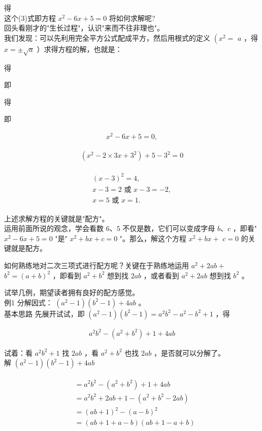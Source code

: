 \documentclass[10pt]{article}
\begin{document}
得\\
这个(3)式即方程 $x^{2}-6 x+5=0$ 将如何求解呢?\\
回头看刚才的"生长过程"，认识"来而不往非理也"。\\
我们发现：可以先利用完全平方公式配成平方，然后用根式的定义 $\left(x^{2}=\right.$ $a$ ，得 $x= \pm \sqrt{a}$ ）求得方程的解，也就是：

得

即

得

即

\begin{align*}
x^{2}-6 x+5=0,
\end{align*}

\begin{align*}
\left(x^{2}-2 \times 3 x+3^{2}\right)+5-3^{2}=0
\end{align*}

\begin{align*}
\begin{gathered}
(x-3)^{2}=4, \\
x-3=2 \text { 或 } x-3=-2, \\
x=5 \text { 或 } x=1 .
\end{gathered}
\end{align*}

上述求解方程的关键就是"配方"。\\
运用前面所说的观念，学会看数 $6 、 5$ 不仅是数，它们可以变成字母 $b 、 c$ ，即看" $x^{2}-6 x+5=0$ "是" $x^{2}+b x+c=0$ "。那么，解这个方程 $x^{2}+b x+$ $c=0$ 的关键就是配方。

如何熟练地对二次三项式进行配方呢？关键在于熟练地运用 $a^{2}+2 a b+$ $b^{2}=(a+b)^{2}$ ，即看到 $a^{2}+b^{2}$ 想到找 $2 a b$ ，或者看到 $a^{2}+2 a b$ 想到找 $b^{2}$ 。

试举几例，期望读者拥有良好的配方感觉。\\
例1 分解因式： $\left(a^{2}-1\right)\left(b^{2}-1\right)+4 a b$ 。\\
基本思路 先展开试试，即 $\left(a^{2}-1\right)\left(b^{2}-1\right)=a^{2} b^{2}-a^{2}-b^{2}+1$ ，得

\begin{align*}
a^{2} b^{2}-\left(a^{2}+b^{2}\right)+1+4 a b
\end{align*}

试着：看 $a^{2} b^{2}+1$ 找 $2 a b$ ，看 $a^{2}+b^{2}$ 也找 $2 a b$ ，是否就可以分解了。\\
解 $\left(a^{2}-1\right)\left(b^{2}-1\right)+4 a b$

\begin{align*}
\begin{aligned}
& =a^{2} b^{2}-\left(a^{2}+b^{2}\right)+1+4 a b \\
& =a^{2} b^{2}+2 a b+1-\left(a^{2}+b^{2}-2 a b\right) \\
& =(a b+1)^{2}-(a-b)^{2} \\
& =(a b+1+a-b)(a b+1-a+b)
\end{aligned}
\end{align*}
\end{document}
